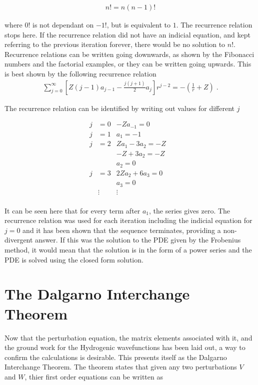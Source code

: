         \begin{align}
            n! = n(n-1)!
        \end{align}

        \noindent where $0!$ is not dependant on $-1!$, but is equivalent to $1$. The recurrence relation stops here. If the recurrence relation did not have an indicial equation, and kept referring to the previous iteration forever, there would be no solution to $n!$. Recurrence relations can be written going downwards, as shown by the Fibonacci numbers and the factorial examples, or they can be written going upwards. This is best shown by the following recurrence relation 
        \begin{align}
            \sum_{j = 0}^\infty \left[ Z(j - 1) a_{j - 1} - \frac{j(j+1)}{2} a_j \right] r^{j - 2} = -\left(\frac{1}{r} + Z\right)\;.
        \end{align}

        \noindent The recurrence relation can be identified by writing out values for different $j$ 

        \begin{align}
            j &= 0 & -Za_{-1} = 0&\\ \nonumber
            j &= 1 & a_1 = -1&\\ \nonumber
            j &= 2 & Za_1 - 3a_2 = -Z&\\ \nonumber
            & & -Z + 3a_2 = -Z&\\ \nonumber
            & & a_2 = 0&\\ \nonumber
            j &= 3 & 2Za_2 + 6a_3 = 0&\\ \nonumber
            & & a_3 = 0&\\ \nonumber
            & \vdots & \vdots & \\
        \end{align}

        \noindent It can be seen here that for every term after $a_1$, the series gives zero. The recurrence relation was used for each iteration including the indicial equation for $j = 0$ and it has been shown that the sequence terminates, providing a non-divergent answer. If this was the solution to the PDE given by the Frobenius method, it would mean that the solution is in the form of a power series and the PDE is solved using the closed form solution.

    \section{The Dalgarno Interchange Theorem} \label{sec:Dalgarno_Interchange_Theorem}
        Now that the perturbation equation, the matrix elements associated with it, and the ground work for the Hydrogenic wavefunctions has been laid out, a way to confirm the calculations is desirable. This presents itself as the Dalgarno Interchange Theorem. The theorem states that given any two perturbations $V$ and $W$, thier first order equations can be written as

